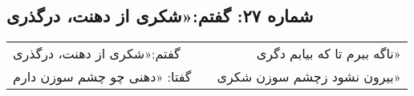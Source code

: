 \begin{center}
\section*{شماره ۲۷: گفتم:‌«شکری از دهنت، درگذری}
\label{sec:027}
\begin{longtable}{l p{0.5cm} r}
گفتم:‌«شکری از دهنت، درگذری
&&
ناگه ببرم تا که بیابم دگری»
\\
گفتا: «دهنی چو چشم سوزن دارم
&&
بیرون نشود زچشم سوزن شکری»
\\
\end{longtable}
\end{center}

